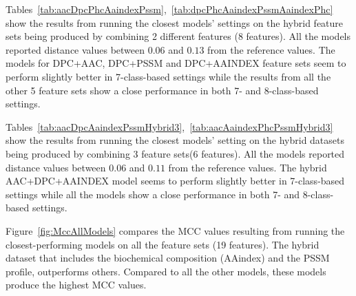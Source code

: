 Tables~\ref{tab:aacDpcPhcAaindexPssm},~\ref{tab:dpcPhcAaindexPssmAaindexPhc} show the results 
from running the closest models’ settings on the hybrid feature sets being produced by 
combining 2 different features (8 features). All the models reported distance values between 
$0.06$ and $0.13$ from the reference values. The models for DPC+AAC, DPC+PSSM and DPC+AAINDEX 
feature sets seem to perform slightly better in 7-class-based settings while the results 
from all the other 5 feature sets show a close performance in both 7- and 8-class-based settings.

Tables~\ref{tab:aacDpcAaindexPssmHybrid3},~\ref{tab:aacAaindexPhcPssmHybrid3} show the results 
from running the closest models' setting on the hybrid datasets being produced by combining 3 
feature sets(6 features). All the models reported distance values between $0.06$ and $0.11$ 
from the reference values. The hybrid AAC+DPC+AAINDEX model seems to perform slightly 
better in 7-class-based settings while all the models show a close performance in 
both 7- and 8-class-based settings.

Figure~\ref{fig:MccAllModels} compares the MCC values resulting from running the 
closest-performing models on all the feature sets (19 features). The hybrid dataset 
that includes the biochemical composition (AAindex) and the PSSM profile, outperforms others. 
Compared to all the other models, these models produce the highest MCC values. 

